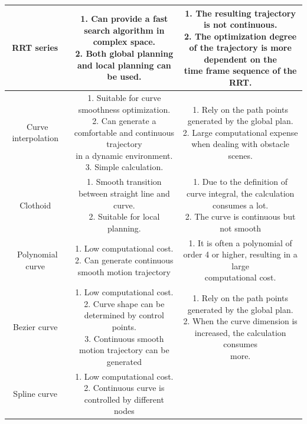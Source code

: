 \documentclass[conference]{IEEEtran}
\begin{document}
\begin{table}[htbp]
\begin{tabular}{|c|c|c|}
		\hline
		RRT series~\cite{karaman2011sampling} & \makecell[l]{1. Can provide a fast search algorithm in complex space.\\ 2. Both global planning and local planning can be used.\\}  & \makecell[l]{1. The resulting trajectory is not continuous.\\ 2. The optimization degree of the trajectory is more dependent on the\\ time frame sequence of the RRT.}\\
		\hline
		Curve interpolation~\cite{gonzalez2015review} & \makecell[l]{1. Suitable for curve smoothness optimization.\\ 2. Can generate a comfortable and continuous trajectory \\in a dynamic environment.\\ 3. Simple calculation. \\}  & \makecell[l]{1. Rely on the path points generated by the global plan.\\ 2. Large computational expense when dealing with obstacle scenes.}\\
		\hline
		Clothoid~\cite{brezak2013real} & \makecell[l]{1. Smooth transition between straight line and curve.\\ 2. Suitable for local planning.\\}  & \makecell[l]{1. Due to the definition of curve integral, the calculation consumes a lot.\\ 2. The curve is continuous but not smooth}\\
		\hline
		Polynomial curve~\cite{piazzi2002quintic,glaser2010maneuver,simon1999vehicle} & \makecell[l]{1. Low computational cost.\\ 2. Can generate continuous smooth motion trajectory\\}  & \makecell[l]{1. It is often a polynomial of order 4 or higher, resulting in a large \\ computational cost.}\\
		\hline
		Bezier curve~\cite{rastelli2014dynamic, choi2008path} & \makecell[l]{1. Low computational cost. \\2. Curve shape can be determined by control points.\\ 3. Continuous smooth motion trajectory can be generated\\ }  & \makecell[l]{1. Rely on the path points generated by the global plan. \\ 2. When the curve dimension is increased, the calculation consumes \\ more. }\\
		\hline
		Spline curve~\cite{shiller1991dynamic, berglund2009planning} & \makecell[l]{1. Low computational cost.\\ 2. Continuous curve is controlled by different nodes\\ }  & \makecell[l]{1. The resulting path may not be optimal. }\\
		\hline
	\end{tabular}
\end{table}
\end{document}
